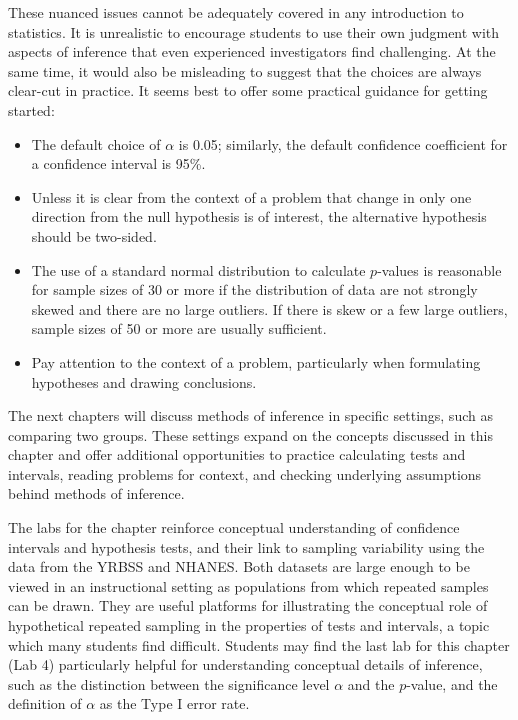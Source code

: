 
These nuanced issues cannot be adequately covered in any introduction to statistics. It is unrealistic to encourage students to use their own judgment with aspects of inference that even experienced investigators find challenging. At the same time, it would also be misleading to suggest that the choices are always clear-cut in practice. It seems best to offer some practical guidance for getting started:

\begin{itemize}
	\item The default choice of $\alpha$ is 0.05; similarly, the default confidence coefficient for a confidence interval is 95\%. 
	
	\item Unless it is clear from the context of a problem that change in only one direction from the null hypothesis is of interest, the alternative hypothesis should be two-sided.
	
	\item The use of a standard normal distribution to calculate $p$-values is reasonable for sample sizes of 30 or more if the distribution of data are not strongly skewed and there are no large outliers. If there is skew or a few large outliers, sample sizes of 50 or more are usually sufficient.
	
	\item Pay attention to the context of a problem, particularly when formulating hypotheses and drawing conclusions.
\end{itemize}

The next chapters will discuss methods of inference in specific settings, such as comparing two groups. These settings expand on the concepts discussed in this chapter and offer additional opportunities to practice calculating tests and intervals, reading problems for context, and checking underlying assumptions behind methods of inference.

The labs for the chapter reinforce conceptual understanding of confidence intervals and hypothesis tests, and their link to sampling variability using the data from the YRBSS and NHANES. Both datasets are large enough to be viewed in an instructional setting as populations from which repeated samples can be drawn.  They are useful platforms for illustrating the conceptual role of hypothetical repeated sampling in the properties of tests and intervals, a topic which many students find difficult. Students may find the last lab for this chapter (Lab 4) particularly helpful for understanding conceptual details of inference, such as the distinction between the significance level $\alpha$ and the $p$-value, and the definition of $\alpha$ as the Type I error rate.

